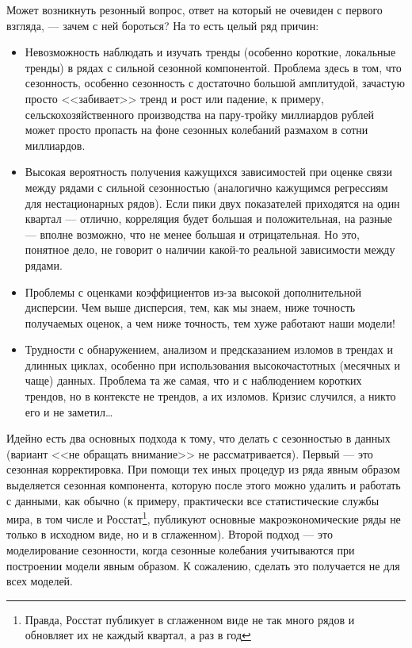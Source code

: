 \documentclass[final,pdftex]{../../template/epsilonj}\usepackage[]{graphicx}\usepackage[]{color}
\begin{document}
Может возникнуть резонный вопрос, ответ на который не очевиден с первого взгляда, --- зачем с ней бороться? На то есть целый ряд причин:

\begin{itemize}
\item Невозможность наблюдать и изучать тренды (особенно короткие, локальные тренды) в рядах с сильной сезонной компонентой. Проблема здесь в том, что сезонность, особенно сезонность с достаточно большой амплитудой, зачастую просто <<забивает>> тренд и рост или падение, к примеру, сельскохозяйственного производства на пару-тройку миллиардов рублей может просто пропасть на фоне сезонных колебаний размахом в сотни миллиардов. 
\item Высокая вероятность получения кажущихся зависимостей при оценке связи между рядами с сильной сезонностью (аналогично кажущимся регрессиям для нестационарных рядов). Если пики двух показателей приходятся на один квартал --- отлично, корреляция будет большая и положительная, на разные --- вполне возможно, что не менее большая и отрицательная. Но это, понятное дело, не говорит о наличии какой-то реальной зависимости между рядами. 
\item Проблемы с оценками коэффициентов из-за высокой дополнительной дисперсии. Чем выше дисперсия, тем, как мы знаем, ниже точность получаемых оценок, а чем ниже точность, тем хуже работают наши модели!
\item Трудности с обнаружением, анализом и предсказанием изломов в трендах и длинных циклах, особенно при использования высокочастотных (месячных и чаще) данных. Проблема та же самая, что и с наблюдением коротких трендов, но в контексте не трендов, а их изломов. Кризис случился, а никто его и не заметил\ldots
\end{itemize}

Идейно есть два основных подхода к тому, что делать с сезонностью в данных (вариант <<не обращать внимание>> не рассматривается). Первый --- это сезонная корректировка. При помощи тех иных процедур из ряда явным образом выделяется сезонная компонента, которую после этого можно удалить и работать с данными, как обычно (к примеру, практически все статистические службы мира, в том числе и Росстат\footnote{Правда, Росстат публикует в сглаженном виде не так много рядов и обновляет их не каждый квартал, а раз в год}, публикуют основные макроэкономические ряды не только в исходном виде, но и в сглаженном). Второй подход --- это моделирование сезонности, когда сезонные колебания учитываются при построении модели явным образом. К сожалению, сделать это получается не для всех моделей. 
\end{document}
